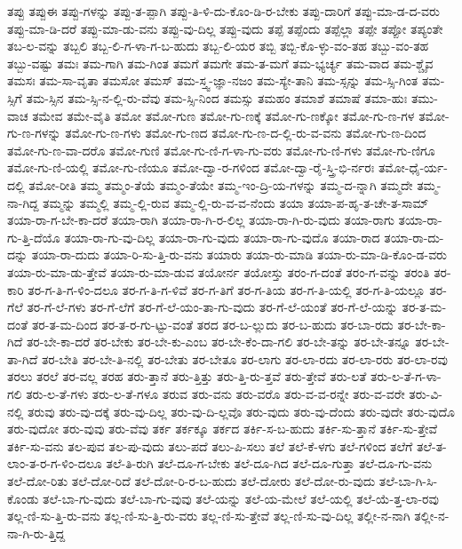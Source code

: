 {ತಪ್ಪು
ತಪ್ಪುಈ
ತಪ್ಪು-ಗಳನ್ನು
ತಪ್ಪು-ತ-ಪ್ಪಾಗಿ
ತಪ್ಪು-ತಿ-ಳಿ-ದು-ಕೊಂ-ಡಿ-ರ-ಬೇಕು
ತಪ್ಪು-ದಾರಿಗೆ
ತಪ್ಪು-ಮಾ-ಡ-ದ-ವರು
ತಪ್ಪು-ಮಾ-ಡಿ-ದರೆ
ತಪ್ಪು-ಮಾ-ಡು-ವನು
ತಪ್ಪು-ವು-ದಿಲ್ಲ
ತಪ್ಪು-ವುದು
ತಪ್ಪೆ
ತಪ್ಪೆಂದು
ತಪ್ಪೆಲ್ಲಾ
ತಪ್ಪೇ
ತಪ್ಪೋ
ತಪ್ಯಂತೇ
ತಬ-ಲ-ವನ್ನು
ತಬ್ಬಲಿ
ತಬ್ಬ-ಲಿ-ಗ-ಳಾ-ಗ-ಬ-ಹುದು
ತಬ್ಬ-ಲಿ-ಯರ
ತಬ್ಬಿ
ತಬ್ಬಿ-ಕೊ-ಳ್ಳು-ವಂ-ತಹ
ತಬ್ಬು-ವಂ-ತಹ
ತಬ್ಬು-ವಷ್ಟು
ತಮಃ
ತಮ-ಗಾಗಿ
ತಮ-ಗಿಂತ
ತಮಗೆ
ತಮಗೇ
ತಮ-ತ-ಮಗೆ
ತಮ-ಭ್ಯರ್ಚ್ಯ
ತಮ-ವಾದ
ತಮ-ಶ್ಚೈವ
ತಮಸಃ
ತಮ-ಸಾ-ವೃತಾ
ತಮಸೋ
ತಮಸ್
ತಮ-ಸ್ತ್ವ-ಜ್ಞಾ-ನಜಂ
ತಮ-ಸ್ಯೇ-ತಾನಿ
ತಮ-ಸ್ಸನ್ನು
ತಮ-ಸ್ಸಿ-ಗಿಂತ
ತಮ-ಸ್ಸಿಗೆ
ತಮ-ಸ್ಸಿನ
ತಮ-ಸ್ಸಿ-ನ-ಲ್ಲಿ-ರು-ವೆವು
ತಮ-ಸ್ಸಿ-ನಿಂದ
ತಮಸ್ಸು
ತಮಹಂ
ತಮಾಶೆ
ತಮಾಷೆ
ತಮಾ-ಹುಃ
ತಮು-ವಾಚ
ತಮೇವ
ತಮೇ-ವೈತಿ
ತಮೋ
ತಮೋ-ಗುಣ
ತಮೋ-ಗು-ಣಕ್ಕೆ
ತಮೋ-ಗು-ಣಕ್ಕೋ
ತಮೋ-ಗು-ಣ-ಗಳ
ತಮೋ-ಗು-ಣ-ಗಳನ್ನು
ತಮೋ-ಗು-ಣ-ಗಳು
ತಮೋ-ಗು-ಣದ
ತಮೋ-ಗು-ಣ-ದ-ಲ್ಲಿ-ರು-ವ-ವನು
ತಮೋ-ಗು-ಣ-ದಿಂದ
ತಮೋ-ಗು-ಣ-ವಾ-ದರೊ
ತಮೋ-ಗುಣಿ
ತಮೋ-ಗು-ಣಿ-ಗ-ಳಾ-ಗು-ವರು
ತಮೋ-ಗು-ಣಿ-ಗಳು
ತಮೋ-ಗು-ಣಿಗೂ
ತಮೋ-ಗು-ಣಿ-ಯಲ್ಲಿ
ತಮೋ-ಗು-ಣಿಯೂ
ತಮೋ-ದ್ವಾ-ರ-ಗಳಿಂದ
ತಮೋ-ದ್ವಾ-ರೈ-ಸ್ತ್ರಿ-ಭಿ-ರ್ನರಃ
ತಮೋ-ಧೈ-ರ್ಯ-ದಲ್ಲಿ
ತಮೋ-ರೀತಿ
ತಮ್ಮ
ತಮ್ಮಂ-ತೆಯೆ
ತಮ್ಮಂ-ತೆಯೇ
ತಮ್ಮ-ಇಂ-ದ್ರಿ-ಯ-ಗಳನ್ನು
ತಮ್ಮ-ದ-ನ್ನಾಗಿ
ತಮ್ಮದೇ
ತಮ್ಮ-ನಾ-ಗಿದ್ದ
ತಮ್ಮನ್ನು
ತಮ್ಮಲ್ಲಿ
ತಮ್ಮ-ಲ್ಲಿ-ರುವ
ತಮ್ಮ-ಲ್ಲಿ-ರು-ವ-ವ-ನೆಂದು
ತಯಾ
ತಯಾ-ಪ-ಹೃ-ತ-ಚೇ-ತ-ಸಾಮ್
ತಯಾ-ರಾ-ಗ-ಬೇ-ಕಾ-ದರೆ
ತಯಾ-ರಾಗಿ
ತಯಾ-ರಾ-ಗಿ-ರ-ಲಿಲ್ಲ
ತಯಾ-ರಾ-ಗಿ-ರು-ವುದು
ತಯಾ-ರಾಗು
ತಯಾ-ರಾ-ಗು-ತ್ತಿ-ದೆಯೊ
ತಯಾ-ರಾ-ಗು-ವು-ದಿಲ್ಲ
ತಯಾ-ರಾ-ಗು-ವುದು
ತಯಾ-ರಾ-ಗು-ವುದೊ
ತಯಾ-ರಾದ
ತಯಾ-ರಾ-ದು-ದನ್ನು
ತಯಾ-ರಾ-ದುದು
ತಯಾ-ರಿ-ಸು-ತ್ತಿ-ರು-ವನು
ತಯಾರು
ತಯಾ-ರು-ಮಾಡಿ
ತಯಾ-ರು-ಮಾ-ಡಿ-ಕೊಂ-ಡ-ವರು
ತಯಾ-ರು-ಮಾ-ಡು-ತ್ತೇವೆ
ತಯಾ-ರು-ಮಾ-ಡುವ
ತಯೋರ್ನ
ತಯೋಸ್ತು
ತರಂ-ಗ-ದಂತೆ
ತರಂ-ಗ-ವನ್ನು
ತರಂತಿ
ತರ-ಕಾರಿ
ತರ-ಗ-ತಿ-ಗ-ಳಿಂ-ದಲೂ
ತರ-ಗ-ತಿ-ಗ-ಳಿವೆ
ತರ-ಗ-ತಿಗೆ
ತರ-ಗ-ತಿಯ
ತರ-ಗ-ತಿ-ಯಲ್ಲಿ
ತರ-ಗ-ತಿ-ಯಲ್ಲೂ
ತರ-ಗೆಲೆ
ತರ-ಗೆ-ಲೆ-ಗಳು
ತರ-ಗೆ-ಲೆಗೆ
ತರ-ಗೆ-ಲೆ-ಯಂ-ತಾ-ಗು-ವುದು
ತರ-ಗೆ-ಲೆ-ಯಂತೆ
ತರ-ಗೆ-ಲೆ-ಯನ್ನು
ತರ-ತ-ಮ-ದಂತೆ
ತರ-ತ-ಮ-ದಿಂದ
ತರ-ತ-ರ-ಗು-ಟ್ಟು-ವಂತೆ
ತರದ
ತರ-ಬ-ಲ್ಲುದು
ತರ-ಬ-ಹುದು
ತರ-ಬಾ-ರದು
ತರ-ಬೇ-ಕಾ-ಗಿದೆ
ತರ-ಬೇ-ಕಾ-ದರೆ
ತರ-ಬೇಕು
ತರ-ಬೇ-ಕು-ಎಂಬ
ತರ-ಬೇ-ಕೆಂ-ದಾ-ಗಲಿ
ತರ-ಬೇ-ತನ್ನು
ತರ-ಬೇ-ತನ್ನೂ
ತರ-ಬೇ-ತಾ-ಗಿದೆ
ತರ-ಬೇತಿ
ತರ-ಬೇ-ತಿ-ನಲ್ಲಿ
ತರ-ಬೇತು
ತರ-ಬೇತೂ
ತರ-ಲಾಗು
ತರ-ಲಾ-ರದು
ತರ-ಲಾ-ರರು
ತರ-ಲಾ-ರವು
ತರಲು
ತರಲೆ
ತರ-ವಲ್ಲ
ತರಹ
ತರು-ತ್ತಾನೆ
ತರು-ತ್ತಿತ್ತು
ತರು-ತ್ತಿ-ರು-ತ್ತವೆ
ತರು-ತ್ತೇವೆ
ತರು-ಲತೆ
ತರು-ಲ-ತೆ-ಗ-ಳಾ-ಗಲಿ
ತರು-ಲ-ತೆ-ಗಳು
ತರು-ಲ-ತೆ-ಗಳೂ
ತರುವ
ತರು-ವನು
ತರು-ವರೊ
ತರು-ವ-ವ-ರನ್ನೇ
ತರು-ವ-ವರೇ
ತರು-ವಿ-ನಲ್ಲಿ
ತರುವು
ತರು-ವು-ದಕ್ಕೆ
ತರು-ವು-ದಿಲ್ಲ
ತರು-ವು-ದಿ-ಲ್ಲವೊ
ತರು-ವುದು
ತರು-ವು-ದೆಂದು
ತರು-ವುದೇ
ತರು-ವುದೊ
ತರು-ವುದೋ
ತರು-ವುವು
ತರು-ವೆವು
ತರ್ಕ
ತರ್ಕಕ್ಕೂ
ತರ್ಕದ
ತರ್ಕಿ-ಸ-ಬ-ಹುದು
ತರ್ಕಿ-ಸು-ತ್ತಾನೆ
ತರ್ಕಿ-ಸು-ತ್ತೇವೆ
ತರ್ಕಿ-ಸು-ವನು
ತಲ-ಪುವ
ತಲ-ಪು-ವುದು
ತಲು-ಪದೆ
ತಲು-ಪಿ-ಸಲು
ತಲೆ
ತಲೆ-ಕೆ-ಳಗು
ತಲೆ-ಗಳಿಂದ
ತಲೆಗೆ
ತಲೆ-ತ-ಲಾಂ-ತ-ರ-ಗ-ಳಿಂ-ದಲೂ
ತಲೆ-ತಿ-ರುಗಿ
ತಲೆ-ದೂ-ಗ-ಬೇಕು
ತಲೆ-ದೂ-ಗಿದ
ತಲೆ-ದೂ-ಗುತ್ತಾ
ತಲೆ-ದೂ-ಗು-ವನು
ತಲೆ-ದೋ-ರಿತು
ತಲೆ-ದೋ-ರಿದೆ
ತಲೆ-ದೋ-ರಿ-ರ-ಬ-ಹುದು
ತಲೆ-ದೋರು
ತಲೆ-ದೋ-ರು-ವುದು
ತಲೆ-ಬಾ-ಗಿ-ಸಿ-ಕೊಂಡು
ತಲೆ-ಬಾ-ಗು-ವುದು
ತಲೆ-ಬಾ-ಗು-ವುವು
ತಲೆ-ಯನ್ನು
ತಲೆ-ಯ-ಮೇಲೆ
ತಲೆ-ಯಲ್ಲಿ
ತಲೆ-ಯೆ-ತ್ತ-ಲಾ-ರವು
ತಲ್ಲ-ಣಿ-ಸು-ತ್ತಿ-ರು-ವನು
ತಲ್ಲ-ಣಿ-ಸು-ತ್ತಿ-ರು-ವರು
ತಲ್ಲ-ಣಿ-ಸು-ತ್ತೇವೆ
ತಲ್ಲ-ಣಿ-ಸು-ವು-ದಿಲ್ಲ
ತಲ್ಲೀ-ನ-ನಾಗಿ
ತಲ್ಲೀ-ನ-ನಾ-ಗಿ-ರು-ತ್ತಿದ್ದ
}
